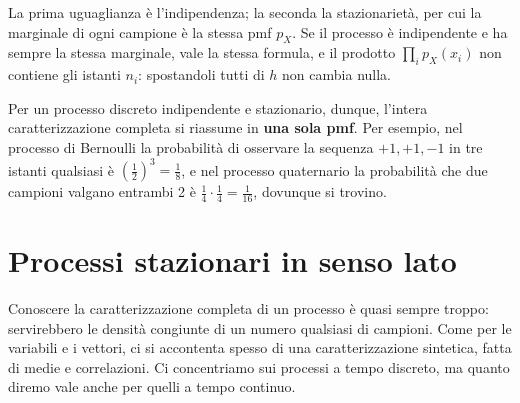 \begin{dimostrazione}
 La prima uguaglianza è l'indipendenza; la seconda la stazionarietà, per cui la marginale di ogni
campione è la stessa pmf $p_X$.
 Se il processo è indipendente e ha sempre la stessa marginale, vale la stessa formula, e il prodotto
$\prod_i p_X(x_i)$ non contiene gli istanti $n_i$: spostandoli tutti di $h$ non cambia nulla.
\end{dimostrazione}

Per un processo discreto indipendente e stazionario, dunque, l'intera caratterizzazione completa si riassume in
\textbf{una sola pmf}. Per esempio, nel processo di Bernoulli la probabilità di osservare la sequenza $+1, +1, -1$ in tre
istanti qualsiasi è $\left( \frac12 \right)^3 = \frac18$, e nel processo quaternario la probabilità che due campioni
valgano entrambi 2 è $\frac14 \cdot \frac14 = \frac{1}{16}$, dovunque si trovino.

\section{Processi stazionari in senso lato}

Conoscere la caratterizzazione completa di un processo è quasi sempre troppo: servirebbero le densità congiunte di un
numero qualsiasi di campioni. Come per le variabili e i vettori, ci si accontenta spesso di una caratterizzazione
sintetica, fatta di medie e correlazioni. Ci concentriamo sui processi a tempo discreto, ma quanto diremo vale anche per
quelli a tempo continuo.



